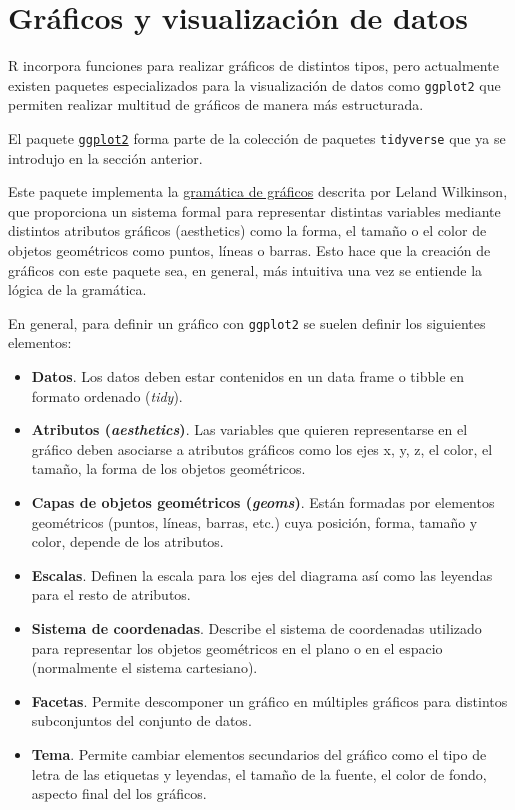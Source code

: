 \documentclass[
  a4paper,
]{scrreport}
\providecommand{\tightlist}{%
  \setlength{\itemsep}{0pt}\setlength{\parskip}{0pt}}\usepackage{longtable,booktabs,array}
\theoremstyle{definition}
\theoremstyle{definition}
\theoremstyle{remark}
\begin{document}
\hypertarget{gruxe1ficos-y-visualizaciuxf3n-de-datos}{%
\chapter{Gráficos y visualización de
datos}\label{gruxe1ficos-y-visualizaciuxf3n-de-datos}}

R incorpora funciones para realizar gráficos de distintos tipos, pero
actualmente existen paquetes especializados para la visualización de
datos como \texttt{ggplot2} que permiten realizar multitud de gráficos
de manera más estructurada.

El paquete \href{https://ggplot2.tidyverse.org/}{\texttt{ggplot2}} forma
parte de la colección de paquetes \texttt{tidyverse} que ya se introdujo
en la sección anterior.

Este paquete implementa la
\href{https://www.academia.edu/54823545/The_grammar_of_graphics}{gramática
de gráficos} descrita por Leland Wilkinson, que proporciona un sistema
formal para representar distintas variables mediante distintos atributos
gráficos (aesthetics) como la forma, el tamaño o el color de objetos
geométricos como puntos, líneas o barras. Esto hace que la creación de
gráficos con este paquete sea, en general, más intuitiva una vez se
entiende la lógica de la gramática.

En general, para definir un gráfico con \texttt{ggplot2} se suelen
definir los siguientes elementos:

\begin{itemize}
\tightlist
\item
  \textbf{Datos}. Los datos deben estar contenidos en un data frame o
  tibble en formato ordenado (\emph{tidy}).
\item
  \textbf{Atributos (\emph{aesthetics})}. Las variables que quieren
  representarse en el gráfico deben asociarse a atributos gráficos como
  los ejes x, y, z, el color, el tamaño, la forma de los objetos
  geométricos.
\item
  \textbf{Capas de objetos geométricos (\emph{geoms})}. Están formadas
  por elementos geométricos (puntos, líneas, barras, etc.) cuya
  posición, forma, tamaño y color, depende de los atributos.
\item
  \textbf{Escalas}. Definen la escala para los ejes del diagrama así
  como las leyendas para el resto de atributos.
\item
  \textbf{Sistema de coordenadas}. Describe el sistema de coordenadas
  utilizado para representar los objetos geométricos en el plano o en el
  espacio (normalmente el sistema cartesiano).
\item
  \textbf{Facetas}. Permite descomponer un gráfico en múltiples gráficos
  para distintos subconjuntos del conjunto de datos.
\item
  \textbf{Tema}. Permite cambiar elementos secundarios del gráfico como
  el tipo de letra de las etiquetas y leyendas, el tamaño de la fuente,
  el color de fondo, aspecto final del los gráficos.
\end{itemize}
\end{document}
